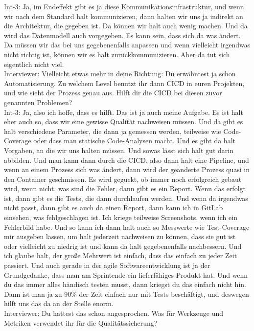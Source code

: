Int-3: Ja, im Endeffekt gibt es ja diese Kommunikationsinfrastruktur, und wenn wir nach dem Standard halt kommunizieren, dann halten wir uns ja indirekt an die Architektur, die gegeben ist. Da können wir halt auch wenig machen. Und da wird das Datenmodell auch vorgegeben. Es kann sein, dass sich da was ändert. Da müssen wir das bei uns gegebenenfalls anpassen und wenn vielleicht irgendwas nicht richtig ist, können wir es halt zurückkommunizieren. Aber da tut sich eigentlich nicht viel.\\
Interviewer: Vielleicht etwas mehr in deine Richtung: Du erwähntest ja schon Automatisierung. Zu welchem Level benutzt ihr dann CICD in euren Projekten, und wie sieht der Prozess genau aus. Hilft dir die CICD bei diesen zuvor genannten Problemen? \\
Int-3: Ja, also ich hoffe, dass es hilft. Das ist ja auch meine Aufgabe. Es ist halt eher auch so, dass wir eine gewisse Qualität nachweisen müssen. Und da gibt es halt verschiedene Parameter, die dann ja gemessen werden, teilweise wie Code-Coverage oder dass man statische Code-Analysen macht. Und es gibt da halt Vorgaben, an die wir uns halten müssen. Und sowas lässt sich halt gut darin abbilden. Und man kann dann durch die CICD, also dann halt eine Pipeline, und wenn an einem Prozess sich was ändert, dann wird der geänderte Prozess quasi in den Container geschmissen. Es wird geguckt, ob immer noch erfolgreich gebaut wird, wenn nicht, was sind die Fehler, dann gibt es ein Report. Wenn das erfolgt ist, dann gibt es die Tests, die dann durchlaufen werden. Und wenn da irgendwas nicht passt, dann gibt es auch da einen Report, dann kann ich in GitLab einsehen, was fehlgeschlagen ist. Ich kriege teilweise Screenshots, wenn ich ein Fehlerbild habe. Und so kann ich dann halt auch so Messwerte wie Test-Coverage mir ausgeben lassen, um halt jederzeit nachweisen zu können, dass sie gut ist oder vielleicht zu niedrig ist und kann da halt gegebenenfalls nachbessern. Und ich glaube halt, der große Mehrwert ist einfach, dass das einfach zu jeder Zeit passiert. Und auch gerade in der agile Softwareentwicklung ist ja der Grundgedanke, dass man am Sprintende ein lieferfähiges Produkt hat. Und wenn du das immer alles händisch testen musst, dann kriegst du das einfach nicht hin. Dann ist man ja zu 90\% der Zeit einfach nur mit Tests beschäftigt, und deswegen hilft uns das da an der Stelle enorm.\\
Interviewer: Du hattest das schon angesprochen. Was für Werkzeuge und Metriken verwendet ihr für die Qualitätssicherung?\\

